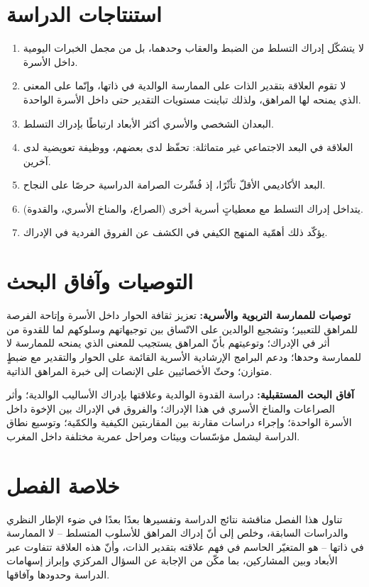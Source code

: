 \documentclass[12pt,oneside]{report}
\begin{document}
\section{استنتاجات الدراسة}
\begin{enumerate}[leftmargin=2em,itemsep=1pt]
\item لا يتشكّل إدراك التسلط من الضبط والعقاب وحدهما، بل من مجمل الخبرات اليومية داخل الأسرة.
\item لا تقوم العلاقة بتقدير الذات على الممارسة الوالدية في ذاتها، وإنّما على المعنى الذي يمنحه
لها المراهق، ولذلك تباينت مستويات التقدير حتى داخل الأسرة الواحدة.
\item البعدان الشخصي والأسري أكثر الأبعاد ارتباطًا بإدراك التسلط.
\item العلاقة في البعد الاجتماعي غير متماثلة: تحفّظ لدى بعضهم، ووظيفة تعويضية لدى آخرين.
\item البعد الأكاديمي الأقلّ تأثّرًا، إذ فُسِّرت الصرامة الدراسية حرصًا على النجاح.
\item يتداخل إدراك التسلط مع معطياتٍ أسرية أخرى (الصراع، والمناخ الأسري، والقدوة).
\item يؤكّد ذلك أهمّية المنهج الكيفي في الكشف عن الفروق الفردية في الإدراك.
\end{enumerate}

\section{التوصيات وآفاق البحث}
\noindent\textbf{توصيات للممارسة التربوية والأسرية:} تعزيز ثقافة الحوار داخل الأسرة وإتاحة
الفرصة للمراهق للتعبير؛ وتشجيع الوالدين على الاتّساق بين توجيهاتهم وسلوكهم لما للقدوة من أثر في
الإدراك؛ وتوعيتهم بأنّ المراهق يستجيب للمعنى الذي يمنحه للممارسة لا للممارسة وحدها؛ ودعم البرامج
الإرشادية الأسرية القائمة على الحوار والتقدير مع ضبطٍ متوازن؛ وحثّ الأخصائيين على الإنصات إلى
خبرة المراهق الذاتية.\par
\noindent\textbf{آفاق البحث المستقبلية:} دراسة القدوة الوالدية وعلاقتها بإدراك الأساليب الوالدية؛
وأثر الصراعات والمناخ الأسري في هذا الإدراك؛ والفروق في الإدراك بين الإخوة داخل الأسرة الواحدة؛
وإجراء دراسات مقارنة بين المقاربتين الكيفية والكمّية؛ وتوسيع نطاق الدراسة ليشمل مؤسّسات وبيئات
ومراحل عمرية مختلفة داخل المغرب.

\section*{خلاصة الفصل}
تناول هذا الفصل مناقشة نتائج الدراسة وتفسيرها بعدًا بعدًا في ضوء الإطار النظري والدراسات السابقة،
وخلص إلى أنّ إدراك المراهق للأسلوب المتسلط -- لا الممارسة في ذاتها -- هو المتغيّر الحاسم في فهم
علاقته بتقدير الذات، وأنّ هذه العلاقة تتفاوت عبر الأبعاد وبين المشاركين، بما مكّن من الإجابة عن
السؤال المركزي وإبراز إسهامات الدراسة وحدودها وآفاقها.
\end{document}
